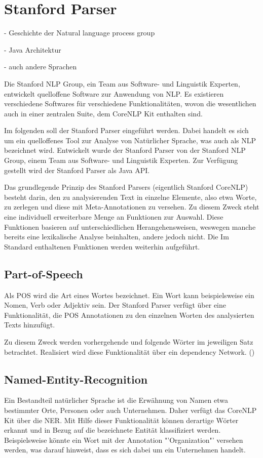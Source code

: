 \section{Stanford Parser}
- Geschichte der Natural language process group\par
- Java Architektur \par 
- auch andere Sprachen \par

Die Stanford \ac{NLP} Group, ein Team aus Software- und Linguistik Experten, entwickelt quelloffene Software zur Anwendung von NLP. Es existieren verschiedene Softwares für verschiedene Funktionalitäten, wovon die wesentlichen auch in einer zentralen Suite, dem CoreNLP Kit enthalten sind.

Im folgenden soll der Stanford Parser eingeführt werden. Dabei handelt es sich um ein quelloffenes Tool zur Analyse von Natürlicher Sprache, was auch als \ac{NLP} bezeichnet wird. Entwickelt wurde der Stanford Parser von der Stanford \ac{NLP} Group, einem Team aus Software- und Linguistik Experten. Zur Verfügung gestellt wird der Stanford Parser als Java API.\par
Das grundlegende Prinzip des Stanford Parsers (eigentlich Stanford CoreNLP) besteht darin, den zu analysierenden Text in einzelne Elemente, also etwa Worte, zu zerlegen und diese mit Meta-Annotationen zu versehen. Zu diesem Zweck steht eine individuell erweiterbare Menge an Funktionen zur Auswahl. Diese Funktionen basieren auf unterschiedlichen Herangehensweisen, weswegen manche bereits eine lexikalische Analyse beinhalten, andere jedoch nicht.
Die Im Standard enthaltenen Funktionen werden weiterhin aufgeführt.

\subsection{Part-of-Speech}
Als \ac{POS} wird die Art eines Wortes bezeichnet. Ein Wort kann beispielsweise ein Nomen, Verb oder Adjektiv sein. Der Stanford Parser verfügt über eine Funktionalität, die \ac{POS} Annotationen zu den einzelnen Worten des analysierten Texts hinzufügt.\par
Zu diesem Zweck werden vorhergehende und folgende Wörter im jeweiligen Satz betrachtet. Realisiert wird diese Funktionalität über ein dependency Network. (\cite[vgl.][1]{POSTAGGER})

\subsection{Named-Entity-Recognition}
Ein Bestandteil natürlicher Sprache ist die Erwähnung von Namen etwa bestimmter Orte, Personen oder auch Unternehmen. Daher verfügt das CoreNLP Kit über die \ac{NER}. Mit Hilfe dieser Funktionalität können derartige Wörter erkannt und in Bezug auf die bezeichnete Entität klassifiziert werden. Beispielsweise könnte ein Wort mit der Annotation "'Organization"' versehen werden, was darauf hinweist, dass es sich dabei um ein Unternehmen handelt.

